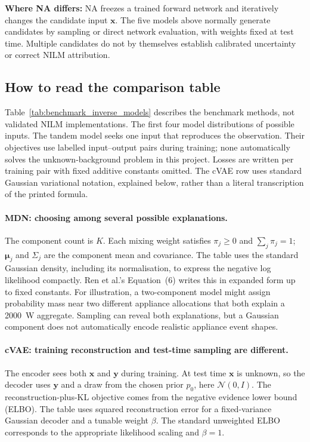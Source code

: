 \documentclass[11pt]{article}
\newcommand{\vect}[1]{\mathbf{#1}}
\begin{document}
\begin{landscape}
\noindent\colorbox{BenchmarkPale}{\parbox{\dimexpr\linewidth-2\fboxsep\relax}{\small
\textbf{Where NA differs:} NA freezes a trained forward network and iteratively changes the candidate input $\vect{x}$. The five models above normally generate candidates by sampling or direct network evaluation, with weights fixed at test time. Multiple candidates do not by themselves establish calibrated uncertainty or correct NILM attribution.}}
\endgroup
\end{landscape}

\subsection{How to read the comparison table}

Table~\ref{tab:benchmark_inverse_models} describes the benchmark methods, not validated NILM implementations. The first four model distributions of possible inputs. The tandem model seeks one input that reproduces the observation. Their objectives use labelled input--output pairs during training; none automatically solves the unknown-background problem in this project. Losses are written per training pair with fixed additive constants omitted. The cVAE row uses standard Gaussian variational notation, explained below, rather than a literal transcription of the printed formula.

\paragraph{MDN: choosing among several possible explanations.}
The component count is $K$. Each mixing weight satisfies $\pi_j\geq0$ and $\sum_j\pi_j=1$; $\boldsymbol\mu_j$ and $\Sigma_j$ are the component mean and covariance. The table uses the standard Gaussian density, including its normalisation, to express the negative log likelihood compactly. Ren et al.'s Equation~(6) writes this in expanded form up to fixed constants. For illustration, a two-component model might assign probability mass near two different appliance allocations that both explain a 2000~W aggregate. Sampling can reveal both explanations, but a Gaussian component does not automatically encode realistic appliance event shapes.

\paragraph{cVAE: training reconstruction and test-time sampling are different.}
The encoder sees both $\vect{x}$ and $\vect{y}$ during training. At test time $\vect{x}$ is unknown, so the decoder uses $\vect{y}$ and a draw from the chosen prior $p_0$, here $\mathcal{N}(0,I)$. The reconstruction-plus-KL objective comes from the negative evidence lower bound (ELBO). The table uses squared reconstruction error for a fixed-variance Gaussian decoder and a tunable weight $\beta$. The standard unweighted ELBO corresponds to the appropriate likelihood scaling and $\beta=1$.
\end{document}

